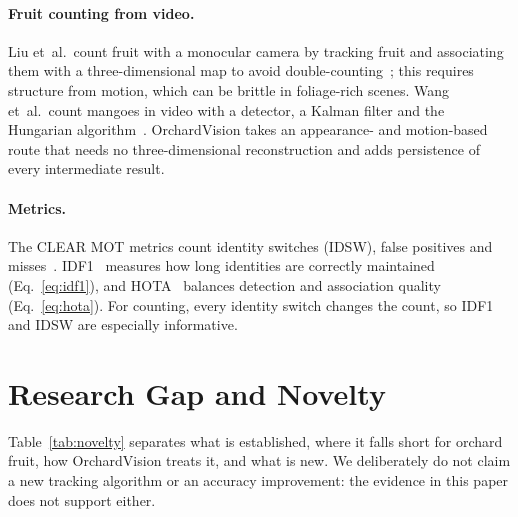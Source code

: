 \documentclass[11pt,a4paper]{article}
\begin{document}
\paragraph{Fruit counting from video.} Liu et~al.\ count fruit with a monocular camera by tracking fruit and associating them with a three-dimensional map to avoid double-counting~\cite{liu2019monocular}; this requires structure from motion, which can be brittle in foliage-rich scenes. Wang et~al.\ count mangoes in video with a detector, a Kalman filter and the Hungarian algorithm~\cite{wang2019mango}. OrchardVision takes an appearance- and motion-based route that needs no three-dimensional reconstruction and adds persistence of every intermediate result.

\paragraph{Metrics.} The CLEAR MOT metrics count identity switches (IDSW), false positives and misses~\cite{bernardin2008clear}. IDF1~\cite{ristani2016idf1} measures how long identities are correctly maintained (Eq.~\ref{eq:idf1}), and HOTA~\cite{luiten2021hota} balances detection and association quality (Eq.~\ref{eq:hota}). For counting, every identity switch changes the count, so IDF1 and IDSW are especially informative.

\section{Research Gap and Novelty}\label{sec:gap}

Table~\ref{tab:novelty} separates what is established, where it falls short for orchard fruit, how OrchardVision treats it, and what is new. We deliberately do not claim a new tracking algorithm or an accuracy improvement: the evidence in this paper does not support either.
\end{document}
